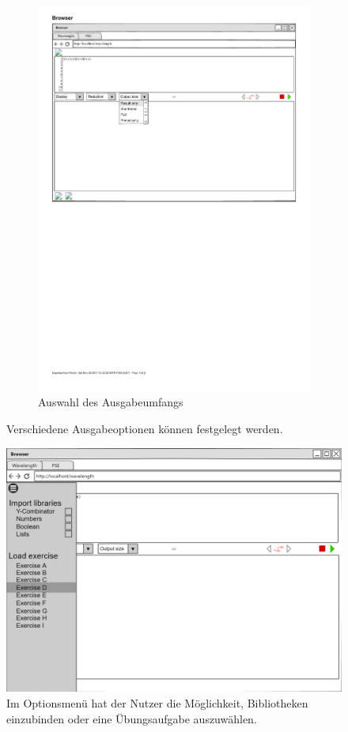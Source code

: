 \documentclass[parskip=full,11pt,twoside]{scrartcl}
\begin{document}
\begin{figure}[H]
\begin{subfigure}[r]{0.25\textwidth}
		\includegraphics{img/outputSizeMenu}
	\caption{Auswahl des Ausgabeumfangs}	
	\end{subfigure}
	\caption{\label{fig:outputOptions} Verschiedene Ausgabeoptionen können festgelegt werden.}
\end{figure}


\begin{figure}[H]
	\centering
	\includegraphics[width=\textwidth]{img/exercise_menue_open.png}
	\caption{\label{fig:exmenu}Im Optionsmenü hat der Nutzer die Möglichkeit, Bibliotheken einzubinden oder eine Übungsaufgabe auszuwählen.}
\end{figure}
\end{document}
